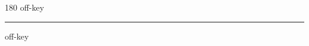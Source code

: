 
\begin{frame}
\begin{center}
\begin{turn}{180}
{\fontsize{2.5cm}{1em}\selectfont off-key}
\end{turn}
\vspace{1em}\par  
\hrule
\vspace{1em}\par  
{\fontsize{2.5cm}{1em}\selectfont off-key}
\end{center}
\end{frame}
